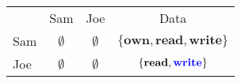 \begin{center}
\begin{tabular}{l|c|c|c|}
\multicolumn{1}{c}{} & \multicolumn{1}{c}{Sam} & \multicolumn{1}{c}{Joe} & \multicolumn{1}{c}{Data} \\\cline{2-4}
Sam & $\emptyset$ & $\emptyset$ & $\{\textbf{own}, \textbf{read}, \textbf{write}\}$ \\\cline{2-4}
Joe & $\emptyset$ & $\emptyset$ & $\{\textbf{read}, {\color{blue}\textbf{write}}\}$ \\\cline{2-4}
\end{tabular}
\end{center}

